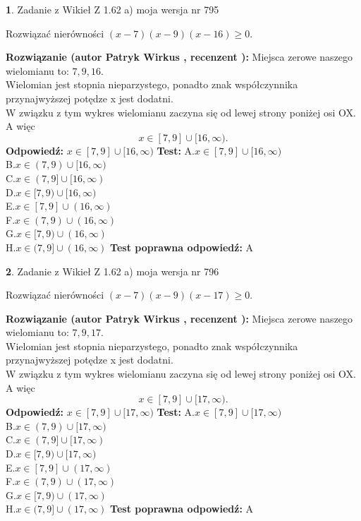 \documentclass[12pt, a4paper]{article}
\theoremstyle{definition} %
\newtheorem{zad}{}
\newcommand{\zadStart}[1]{\begin{zad}#1\newline}
\newcommand{\zadStop}{\end{zad}}
\newcommand{\rozwStart}[2]{\noindent \textbf{Rozwiązanie (autor #1 , recenzent #2): }\newline}
\newcommand{\rozwStop}{\newline}
\newcommand{\odpStart}{\noindent \textbf{Odpowiedź:}\newline}
\newcommand{\odpStop}{\newline}
\newcommand{\testStart}{\noindent \textbf{Test:}\newline}
\newcommand{\testStop}{\newline}
\newcommand{\kluczStart}{\noindent \textbf{Test poprawna odpowiedź:}\newline}
\newcommand{\kluczStop}{\newline}
\begin{document}
\zadStart{Zadanie z Wikieł Z 1.62 a) moja wersja nr 795}

Rozwiązać nierówności $(x-7)(x-9)(x-16)\ge0$.
\zadStop
\rozwStart{Patryk Wirkus}{}
Miejsca zerowe naszego wielomianu to: $7, 9, 16$.\\
Wielomian jest stopnia nieparzystego, ponadto znak współczynnika przy\linebreak najwyższej potędze x jest dodatni.\\ W związku z tym wykres wielomianu zaczyna się od lewej strony poniżej osi OX. A więc $$x \in [7,9] \cup [16,\infty).$$
\rozwStop
\odpStart
$x \in [7,9] \cup [16,\infty)$
\odpStop
\testStart
A.$x \in [7,9] \cup [16,\infty)$\\
B.$x \in (7,9) \cup [16,\infty)$\\
C.$x \in (7,9] \cup [16,\infty)$\\
D.$x \in [7,9) \cup [16,\infty)$\\
E.$x \in [7,9] \cup (16,\infty)$\\
F.$x \in (7,9) \cup (16,\infty)$\\
G.$x \in [7,9) \cup (16,\infty)$\\
H.$x \in (7,9] \cup (16,\infty)$
\testStop
\kluczStart
A
\kluczStop



\zadStart{Zadanie z Wikieł Z 1.62 a) moja wersja nr 796}

Rozwiązać nierówności $(x-7)(x-9)(x-17)\ge0$.
\zadStop
\rozwStart{Patryk Wirkus}{}
Miejsca zerowe naszego wielomianu to: $7, 9, 17$.\\
Wielomian jest stopnia nieparzystego, ponadto znak współczynnika przy\linebreak najwyższej potędze x jest dodatni.\\ W związku z tym wykres wielomianu zaczyna się od lewej strony poniżej osi OX. A więc $$x \in [7,9] \cup [17,\infty).$$
\rozwStop
\odpStart
$x \in [7,9] \cup [17,\infty)$
\odpStop
\testStart
A.$x \in [7,9] \cup [17,\infty)$\\
B.$x \in (7,9) \cup [17,\infty)$\\
C.$x \in (7,9] \cup [17,\infty)$\\
D.$x \in [7,9) \cup [17,\infty)$\\
E.$x \in [7,9] \cup (17,\infty)$\\
F.$x \in (7,9) \cup (17,\infty)$\\
G.$x \in [7,9) \cup (17,\infty)$\\
H.$x \in (7,9] \cup (17,\infty)$
\testStop
\kluczStart
A
\kluczStop
\end{document}
